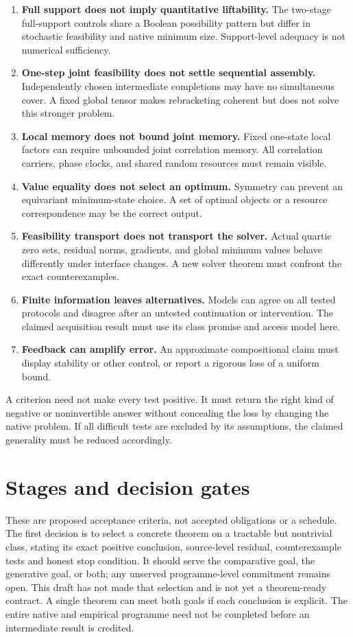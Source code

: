 \documentclass[11pt]{article}
\theoremstyle{remark}
\begin{document}
\begin{enumerate}
\item \textbf{Full support does not imply quantitative liftability.} The two-stage full-support controls share a Boolean possibility pattern but differ in stochastic feasibility and native minimum size. Support-level adequacy is not numerical sufficiency.
\item \textbf{One-step joint feasibility does not settle sequential assembly.} Independently chosen intermediate completions may have no simultaneous cover. A fixed global tensor makes rebracketing coherent but does not solve this stronger problem.
\item \textbf{Local memory does not bound joint memory.} Fixed one-state local factors can require unbounded joint correlation memory. All correlation carriers, phase clocks, and shared random resources must remain visible.
\item \textbf{Value equality does not select an optimum.} Symmetry can prevent an equivariant minimum-state choice. A set of optimal objects or a resource correspondence may be the correct output.
\item \textbf{Feasibility transport does not transport the solver.} Actual quartic zero sets, residual norms, gradients, and global minimum values behave differently under interface changes. A new solver theorem must confront the exact counterexamples.
\item \textbf{Finite information leaves alternatives.} Models can agree on all tested protocols and disagree after an untested continuation or intervention. The claimed acquisition result must use its class promise and access model here.
\item \textbf{Feedback can amplify error.} An approximate compositional claim must display stability or other control, or report a rigorous loss of a uniform bound.
\end{enumerate}

A criterion need not make every test positive. It must return the right kind of negative or noninvertible answer without concealing the loss by changing the native problem. If all difficult tests are excluded by its assumptions, the claimed generality must be reduced accordingly.

\section{Stages and decision gates}
\label{sec:gates}

These are proposed acceptance criteria, not accepted obligations or a schedule. The first decision is to select a concrete theorem on a tractable but nontrivial class, stating its exact positive conclusion, source-level residual, counterexample tests and honest stop condition. It should serve the comparative goal, the generative goal, or both; any unserved programme-level commitment remains open. This draft has not made that selection and is not yet a theorem-ready contract. A single theorem can meet both goals if each conclusion is explicit. The entire native and empirical programme need not be completed before an intermediate result is credited.
\end{document}
